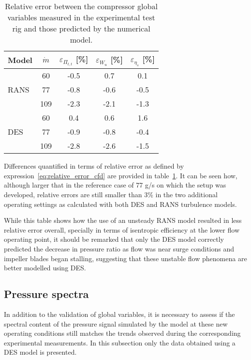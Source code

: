 \begin{table}[htb!]
\centering
\caption[Validation of global variables for each condition]{Relative error between the compressor global variables measured in the experimental test rig and those predicted by the numerical model.}
\footnotesize
\begin{tabular}{lcccc}
\toprule
Model & $\dot{m}$ & $\varepsilon_{\varPi_{t,t}}$ [\%] & $\varepsilon_{W_u}$ [\%] & $\varepsilon_{\eta_s}$ [\%] \\ \midrule

\multirow{3}{*}{RANS} & 60 & -0.5 & 0.7 & 0.1  \\ 
					& 77 & -0.8 & -0.6 & -0.5  \\
					& 109 & -2.3 & -2.1 & -1.3  \\ \midrule
					
\multirow{3}{*}{DES} & 60 & 0.4 & 0.6 & 1.6  \\
					& 77 & -0.9 & -0.8 & -0.4  \\
					& 109 & -2.8 & -2.6 & -1.5  \\ \bottomrule
\end{tabular}
\label{tab:ops_globalVariables}
\end{table}

Differences quantified in terms of relative error as defined by expression~\ref{eq:relative_error_cfd} are provided in table~\ref{tab:ops_globalVariables}. It can be seen how, although larger that in the reference case of 77 g/s on which the setup was developed, relative errors are still smaller than 3\% in the two additional operating settings as calculated with both DES and RANS turbulence models.

While this table shows how the use of an unsteady RANS model resulted in less relative error overall, specially in terms of isentropic efficiency at the lower flow operating point, it should be remarked that only the DES model correctly predicted the decrease in pressure ratio as flow was near surge conditions and impeller blades began stalling, suggesting that these unstable flow phenomena are better modelled using DES. 

\subsection{Pressure spectra}

In addition to the validation of global variables, it is necessary to assess if the spectral content of the pressure signal simulated by the model at these new operating conditions still matches the trends observed during the corresponding experimental measurements. In this subsection only the data obtained using a DES model is presented.

